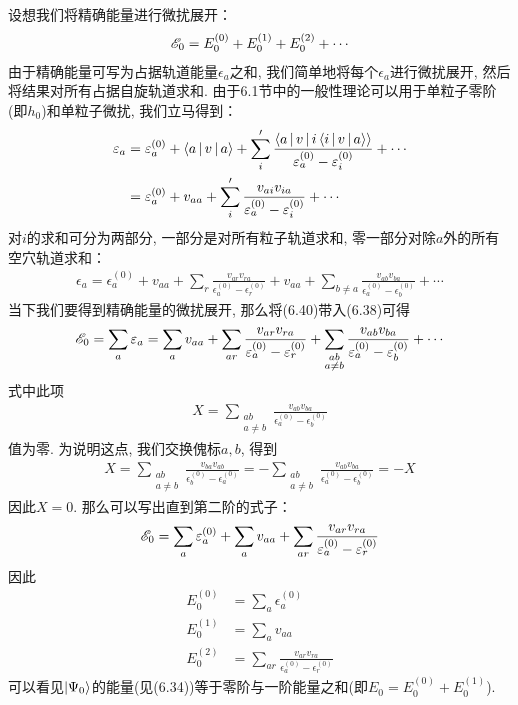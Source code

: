 设想我们将精确能量进行微扰展开：
\begin{align*}
\mathscr{E}_0 = E_0^{(0)} + E_0^{(1)} + E_0^{(2)} + \cdots
\end{align*}
由于精确能量可写为占据轨道能量$\epsilon_a$之和,  我们简单地将每个$\epsilon_a$进行微扰展开, 然后将结果对所有占据自旋轨道求和. 由于6.1节中的一般性理论可以用于单粒子零阶\ha (即$h_0$)和单粒子微扰, 我们立马得到：
\begin{align}
\varepsilon_a & = \varepsilon_a^{(0)} + \Braket{a|v|a} + \sum_i'\frac{\Braket{a|v|i\Braket{i|v|a}}}{\varepsilon_a^{(0)}-\varepsilon_i^{(0)}} + \cdots\notag\\
	       & = \varepsilon_a^{(0)} + v_{aa} + \sum_i'\frac{v_{ai}v_{ia}}{\varepsilon_a^{(0)}-\varepsilon_i^{(0)}} + \cdots
\end{align}
对$i$的求和可分为两部分, 一部分是对所有粒子轨道求和, 零一部分对除$a$外的所有空穴轨道求和：
\begin{align}
\epsilon_a = \epsilon_a^{(0)} + v_{aa} + \sum_r\frac{v_{ar}v_{ra}}{\epsilon_a^{(0)}-\epsilon_r^{(0)}} + v_{aa} + \sum_{b\neq a}\frac{v_{ab}v_{ba}}{\epsilon_a^{(0)}-\epsilon_b^{(0)}} + \cdots
\end{align}
当下我们要得到精确能量的微扰展开, 那么将(6.40)带入(6.38)可得
\begin{align}
\mathscr{E}_0 = \sum_a\varepsilon_a = \sum_av_{aa} + \sum_{ar}\frac{v_{ar}v_{ra}}{\varepsilon_a^{(0)} - \varepsilon_{r}^{(0)}} + \sum_{\substack{ab\\a\neq b}}\frac{v_{ab}v_{ba}}{\varepsilon_a^{(0)}- \varepsilon_{b}^{(0)}} + \cdots
\end{align}
式中此项
\begin{align*}
X = \sum_{\substack{ab\\a\neq b}}\frac{v_{ab}v_{ba}}{\epsilon_a^{(0)}- \epsilon_{b}^{(0)}} 
\end{align*}
值为零. 为说明这点, 我们交换傀标$a,b$, 得到
\begin{align*}
X = \sum_{\substack{ab\\a\neq b}}\frac{v_{ba}v_{ab}}{\epsilon_b^{(0)}- \epsilon_{a}^{(0)}}  = - \sum_{\substack{ab\\a\neq b}}\frac{v_{ab}v_{ba}}{\epsilon_a^{(0)}- \epsilon_{b}^{(0)}} = -X 
\end{align*}
因此$X=0$. 那么可以写出直到第二阶的式子：
\begin{align}
\mathscr{E}_0 = \sum_a\varepsilon_a^{(0)} + \sum_av_{aa} + \sum_{ar}\frac{v_{ar}v_{ra}}{\varepsilon_a^{(0)} - \varepsilon_{r}^{(0)}}
\end{align}
因此
\begin{subequations}
\begin{align}
E_0^{(0)} & = \sum_a\epsilon_a^{(0)}\\
E_0^{(1)} & = \sum_av_{aa} \label{6.43b}\\
E_0^{(2)} & = \sum_{ar}\frac{v_{ar}v_{ra}}{\epsilon_a^{(0)} - \epsilon_r^{(0)}}
\label{6.43c}
\end{align}
\end{subequations}
可以看见$\Ket{\Psi_0}$的能量(见(6.34))等于零阶与一阶能量之和(即$E_0 = E_0^{(0)}+E_0^{(1)}$).


